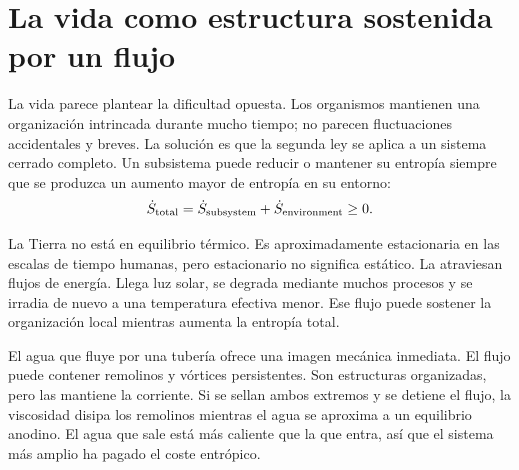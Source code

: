 \begin{classroomqa}\end{classroomqa}

\section{La vida como estructura sostenida por un flujo}

La vida parece plantear la dificultad opuesta. Los organismos mantienen una organización intrincada durante mucho tiempo; no parecen fluctuaciones accidentales y breves. La solución es que la segunda ley se aplica a un sistema cerrado completo. Un subsistema puede reducir o mantener su entropía siempre que se produzca un aumento mayor de entropía en su entorno:
\begin{equation}
 \dot S_{\rm total}
 =\dot S_{\rm subsystem}+\dot S_{\rm environment}\geq 0.
 \label{eq:sm8-open-system-second-law}
\end{equation}

La Tierra no está en equilibrio térmico. Es aproximadamente estacionaria en las escalas de tiempo humanas, pero estacionario no significa estático. La atraviesan flujos de energía. Llega luz solar, se degrada mediante muchos procesos y se irradia de nuevo a una temperatura efectiva menor. Ese flujo puede sostener la organización local mientras aumenta la entropía total.

El agua que fluye por una tubería ofrece una imagen mecánica inmediata. El flujo puede contener remolinos y vórtices persistentes. Son estructuras organizadas, pero las mantiene la corriente. Si se sellan ambos extremos y se detiene el flujo, la viscosidad disipa los remolinos mientras el agua se aproxima a un equilibrio anodino. El agua que sale está más caliente que la que entra, así que el sistema más amplio ha pagado el coste entrópico.

